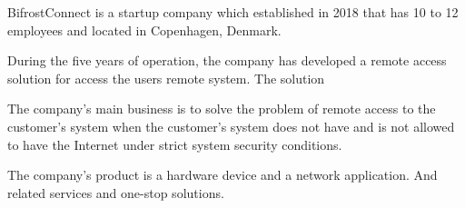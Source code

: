 
BifrostConnect is a startup company which established in 2018 
that has 10 to 12 employees and located in Copenhagen, Denmark.

During the five years of operation, the company has developed
a remote access solution for access the users remote system.
The solution  


The company's main business is to solve the problem of remote access 
to the customer's system when the customer's system does not have 
and is not allowed to have the Internet under strict system security conditions.

The company's product is a hardware device and a network application.
And related services and one-stop solutions.